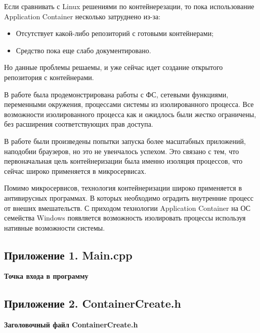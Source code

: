Если сравнивать с Linux решениями по контейнерезации, то пока использование Application Container несколько затруднено из-за:
\begin{itemize}
\item Отсутствует какой-либо репозиторий с готовыми контейнерами;
\item Средство пока еще слабо документировано.
\end{itemize}
Но данные проблемы решаемы, и уже сейчас идет создание открытого репозитория с контейнерами.

В работе была продемонстрирована работы с ФС, сетевыми функциями, переменными окружения, процессами системы из изолированного процесса. Все возможности изолированного процесса как и ожидлось были жестко ограничены, без расширения соответствующих прав доступа.

В работе были произведены попытки запуска более масштабных приложений, наподобии браузеров, но это не увенчалось успехом. Это связано с тем, что первоначальная цель контейнеризации была именно изоляция процессов, что сейчас широко применяется в микросервисах.

Помимо микросервисов, технология контейнеризации широко применяется в антивирусных программах. В которых необходимо оградить внутренние процесс от внеших вмешательств. С приходом технологии Application Container на ОС семейства Windows появляется возможность изолировать процессы используя нативные возможности системы.


\clearpage
{}



\nocite{windowscontainers}
\nocite{jail}
\nocite{Docker}


\clearpage
{}
\subsection*{Приложение 1. Main.cpp} \label{p1:1}
\textbf{Точка входа в программу}

\subsection*{Приложение 2. ContainerCreate.h} \label{p1:1}
\textbf{Заголовочный файл ContainerCreate.h}

